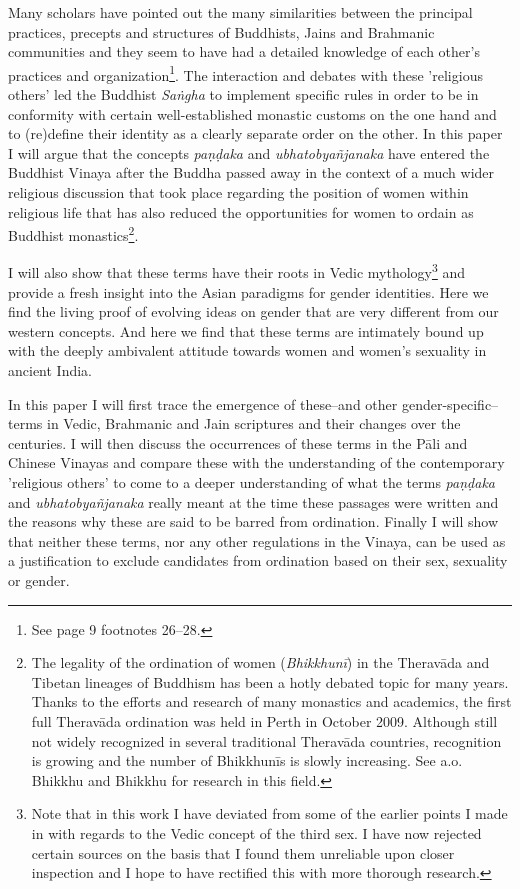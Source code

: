Many scholars have pointed out the many similarities between the principal practices, precepts and structures of Buddhists, Jains and Brahmanic communities and they seem to have had a detailed knowledge of each other's practices and organization\footnote{See \cite{maes2016} page 9 footnotes 26–28.}. The interaction and debates with these 'religious others' led the Buddhist {\em Saṅgha} to implement specific rules in order to be in conformity with certain well-established monastic customs on the one hand and to (re)define their identity as a clearly separate order on the other. In this paper I will argue that the concepts {\em paṇḍaka} and {\em ubhatob­yañ­janaka} have entered the Buddhist Vinaya after the Buddha passed away in the context of a much wider religious discussion that took place regarding the position of women within religious life that has also reduced the opportunities for women to ordain as Buddhist monastics\footnote{The legality of the ordination of women ({\em Bhikkhunī}) in the Theravāda and Tibetan lineages of Buddhism has been a hotly debated topic for many years. Thanks to the efforts and research of many monastics and academics, the first full Theravāda ordination was held in Perth in October 2009. Although still not widely recognized in several traditional Theravāda countries, recognition is growing and the number of Bhikkhunīs is slowly increasing. See a.o. Bhikkhu \cite{sujato2009} and Bhikkhu \cite{analayo2013} for research in this field.}. 

I will also show that these terms have their roots in Vedic mythology\footnote{Note that in this work I have deviated from some of the earlier points I made in \cite{vimala} with regards to the Vedic concept of the third sex. I have now rejected certain sources on the basis that I found them unreliable upon closer inspection and I hope to have rectified this with more thorough research.} and provide a fresh insight into the Asian paradigms for gender identities. Here we find the living proof of evolving ideas on gender that are very different from our western concepts. And here we find that these terms are intimately bound up with the deeply ambivalent attitude towards women and women's sexuality in ancient India.

In this paper I will first trace the emergence of these--and other gender-specific--terms in Vedic, Brahmanic and Jain scriptures and their changes over the centuries. I will then discuss the occurrences of these terms in the Pāli and Chinese Vinayas and compare these with the understanding of the contemporary 'religious others' to come to a deeper understanding of what the terms {\em paṇḍaka} and {\em ubhatob­yañ­janaka} really meant at the time these passages were written and the reasons why these are said to be barred from ordination. Finally I will show that neither these terms, nor any other regulations in the Vinaya, can be used as a justification to exclude candidates from ordination based on their sex, sexuality or gender.


